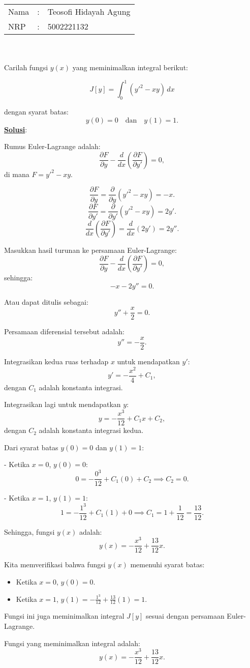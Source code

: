 \documentclass{article}
\newcommand{\jawab}{\textbf{\underline{Solusi}}:}
\begin{document}
\setlength{\parindent}{0pt}
    \noindent
    \begin{tabular}{|lcl|}
     \hline
     Nama&:&Teosofi Hidayah Agung\\
     NRP&:&5002221132\\
     \hline
    \end{tabular}\\~\\
Carilah fungsi \( y(x) \) yang meminimalkan integral berikut:

\[
J[y] = \int_{0}^{1} \left( y'^2 - xy \right) \, dx
\]

dengan syarat batas:
\[
y(0) = 0 \quad \text{dan} \quad y(1) = 1.
\]
\jawab

Rumus Euler-Lagrange adalah:
\[
\frac{\partial F}{\partial y} - \frac{d}{dx} \left( \frac{\partial F}{\partial y'} \right) = 0,
\]
di mana \( F = y'^2 - xy \).

  \[
  \frac{\partial F}{\partial y} = \frac{\partial}{\partial y} \left( y'^2 - xy \right) = -x.
  \]
  \[
  \frac{\partial F}{\partial y'} = \frac{\partial}{\partial y'} \left( y'^2 - xy \right) = 2y'.
  \]
  \[
  \frac{d}{dx} \left( \frac{\partial F}{\partial y'} \right) = \frac{d}{dx} \left( 2y' \right) = 2y''.
  \]

Masukkan hasil turunan ke persamaan Euler-Lagrange:
\[
\frac{\partial F}{\partial y} - \frac{d}{dx} \left( \frac{\partial F}{\partial y'} \right) = 0,
\]
sehingga:
\[
-x - 2y'' = 0.
\]

Atau dapat ditulis sebagai:
\[
y'' + \frac{x}{2} = 0.
\]

Persamaan diferensial tersebut adalah:
\[
y'' = -\frac{x}{2}.
\]

Integrasikan kedua ruas terhadap \( x \) untuk mendapatkan \( y' \):
\[
y' = -\frac{x^2}{4} + C_1,
\]
dengan \( C_1 \) adalah konstanta integrasi.

Integrasikan lagi untuk mendapatkan \( y \):
\[
y = -\frac{x^3}{12} + C_1x + C_2,
\]
dengan \( C_2 \) adalah konstanta integrasi kedua.


Dari syarat batas \( y(0) = 0 \) dan \( y(1) = 1 \):

- Ketika \( x = 0 \), \( y(0) = 0 \):
  \[
  0 = -\frac{0^3}{12} + C_1(0) + C_2 \implies C_2 = 0.
  \]

- Ketika \( x = 1 \), \( y(1) = 1 \):
  \[
  1 = -\frac{1^3}{12} + C_1(1) + 0 \implies C_1 = 1 + \frac{1}{12} = \frac{13}{12}.
  \]

Sehingga, fungsi \( y(x) \) adalah:
\[
y(x) = -\frac{x^3}{12} + \frac{13}{12}x.
\]

Kita memverifikasi bahwa fungsi $y(x)$ memenuhi syarat batas:
\begin{itemize}
    \item Ketika \( x = 0 \), \( y(0) = 0 \).
    \item Ketika \( x = 1 \), \( y(1) = -\frac{1^3}{12} + \frac{13}{12}(1) = 1 \).
\end{itemize}

Fungsi ini juga meminimalkan integral \( J[y] \) sesuai dengan persamaan Euler-Lagrange.

Fungsi yang meminimalkan integral adalah:
\[
y(x) = -\frac{x^3}{12} + \frac{13}{12}x.
\]
\end{document}
